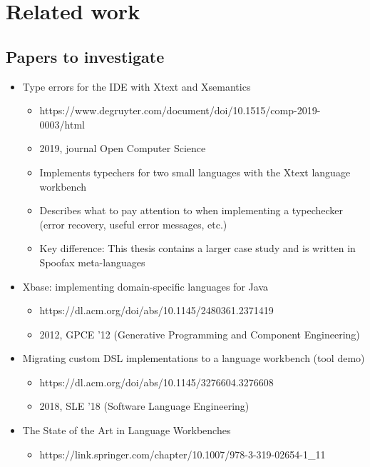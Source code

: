 
\chapter{\label{chap:related-work}Related work}

  \section{Papers to investigate}

    \begin{itemize}
      \item Type errors for the IDE with Xtext and Xsemantics
      \begin{itemize}
        \item https://www.degruyter.com/document/doi/10.1515/comp-2019-0003/html
        \item 2019, journal Open Computer Science
        \item Implements typechers for two small languages with the Xtext language workbench
        \item Describes what to pay attention to when implementing a typechecker (error recovery, useful error messages, etc.)
        \item Key difference: This thesis contains a larger case study and is written in Spoofax meta-languages
      \end{itemize}
      \item Xbase: implementing domain-specific languages for Java
      \begin{itemize}
        \item https://dl.acm.org/doi/abs/10.1145/2480361.2371419
        \item 2012, GPCE '12 (Generative Programming and Component Engineering)
      \end{itemize}
      \item Migrating custom DSL implementations to a language workbench (tool demo)
      \begin{itemize}
        \item https://dl.acm.org/doi/abs/10.1145/3276604.3276608
        \item 2018, SLE '18 (Software Language Engineering)
      \end{itemize}
      \item The State of the Art in Language Workbenches
      \begin{itemize}
        \item https://link.springer.com/chapter/10.1007/978-3-319-02654-1\_11

\end{itemize}
\end{itemize}
